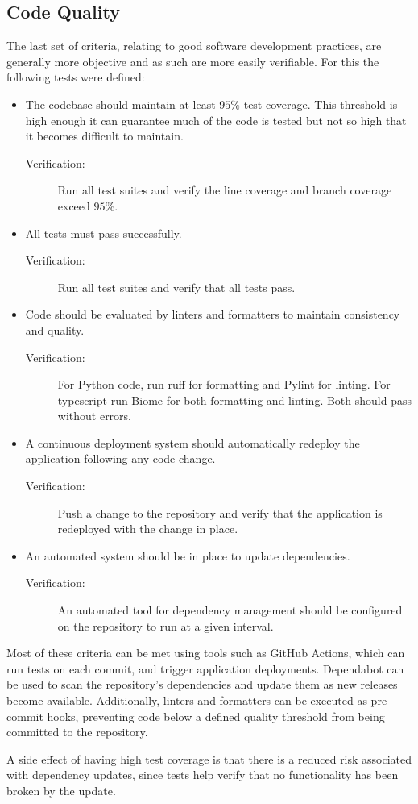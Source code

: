\subsection{Code Quality}
The last set of criteria, relating to good software development practices, are generally more objective and as such are more easily verifiable. For this the following tests were defined:
\begin{itemize}
    \item The codebase should maintain at least $95\%$ test coverage. This threshold is high enough it can guarantee much of the code is tested but not so high that it becomes difficult to maintain.
    \begin{description}
        \item[Verification:] Run all test suites and verify the line coverage and branch coverage exceed $95\%.$
    \end{description}
    \item All tests must pass successfully.
    \begin{description}
        \item[Verification:] Run all test suites and verify that all tests pass.
    \end{description}
    \item Code should be evaluated by linters and formatters to maintain consistency and quality.
    \begin{description}
        \item[Verification:] For Python code, run ruff for formatting and Pylint for linting. For typescript run Biome for both formatting and linting. Both should pass without errors.
    \end{description}
    \item A continuous deployment system should automatically redeploy the application following any code change.
    \begin{description}
        \item[Verification:] Push a change to the repository and verify that the application is redeployed with the change in place.
    \end{description}
    \item An automated system should be in place to update dependencies.
    \begin{description}
        \item[Verification:] An automated tool for dependency management should be configured on the repository to run at a given interval.
    \end{description}
\end{itemize}

Most of these criteria can be met using tools such as GitHub Actions, which can run tests on each commit, and trigger application deployments. Dependabot can be used to scan the repository’s dependencies and update them as new releases become available. Additionally, linters and formatters can be executed as pre-commit hooks, preventing code below a defined quality threshold from being committed to the repository.

A side effect of having high test coverage is that there is a reduced risk associated with dependency updates, since tests help verify that no functionality has been broken by the update.
